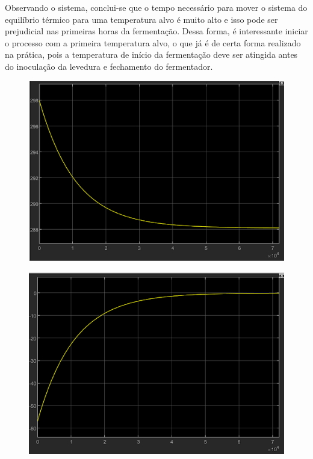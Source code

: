 Observando o sistema, conclui-se que o tempo necessário para mover o sistema do equilíbrio térmico para uma temperatura alvo é muito alto e isso pode ser prejudicial nas primeiras horas da fermentação. Dessa forma, é interessante iniciar o processo com a primeira temperatura alvo, o que já é de certa forma realizado na prática, pois a temperatura de início da fermentação deve ser atingida antes do inoculação da levedura e fechamento do fermentador.


\begin{figure}[H]
    \centering
    \includegraphics[scale=0.60]{figuras/projeto/controle/curva_temp.png}
    \label{fig:curva_temp}
\end{figure}

\begin{figure}[H]
    \centering
    \includegraphics[scale=0.60]{figuras/projeto/controle/curva_q.png}
    \label{fig:curva_q}
\end{figure}

